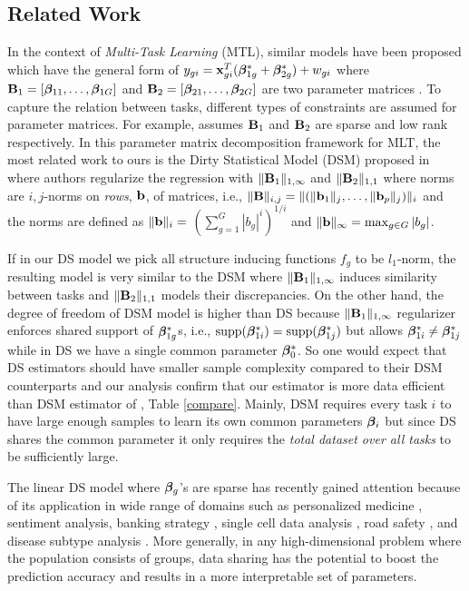 \subsection{Related Work}
In the context of \emph{Multi-Task Learning} (MTL), similar models have been proposed which have the general form of $y_{gi} = \mathbf{x}_{gi}^T (\boldsymbol{\beta}_{1g}^* + \boldsymbol{\beta}^*_{2g}) + w_{gi}$ where $\mathbf{B}_1 = [\boldsymbol{\beta}_{11}, \dots, \boldsymbol{\beta}_{1G}]$ and $\mathbf{B}_2 = [\boldsymbol{\beta}_{21}, \dots, \boldsymbol{\beta}_{2G}]$ are two parameter matrices \cite{Zhang2017-rm}. To capture the relation between tasks, different types of constraints are assumed for parameter matrices. For example, \cite{Chen2012-fb} assumes $\mathbf{B}_1$ and $\mathbf{B}_2$ are sparse and low rank respectively. In this parameter matrix decomposition framework for MLT, the most related work to ours is the Dirty Statistical Model (DSM) proposed in \cite{jrsr10} where authors regularize the regression with $\|\mathbf{B}_1\|_{1, \infty}$ and $\|\mathbf{B}_2\|_{1,1}$ where norms are $i, j$-norms on \emph{rows}, $\mathbf{b}$, of matrices, i.e., $\|\mathbf{B}\|_{i,j} = \|(\|\mathbf{b}_1\|_{j}, \dots, \|\mathbf{b}_p\|_{j})\|_{i}$ and the norms are defined as $\|\mathbf{b}\|_{i} =$ {\small$\left(\sum_{g=1}^{G}|b_g|^i\right)^{1/i}$} and $\|\mathbf{b}\|_{\infty} = \max_{g\in G} |b_g|$. 

If in our DS model we pick all structure inducing functions $f_g$ to be $l_1$-norm, the resulting model is very similar to the DSM where $\|\mathbf{B}_1\|_{1, \infty}$ induces similarity between tasks and $\|\mathbf{B}_2\|_{1,1}$ models their discrepancies. On the other hand, the degree of freedom of DSM model is higher than DS because $\|\mathbf{B}_1\|_{1, \infty}$ regularizer enforces shared support of $\boldsymbol{\beta}^*_{1g}$s, i.e., $\text{supp}(\boldsymbol{\beta}_{1i}^*) = \text{supp}(\boldsymbol{\beta}_{1j}^*)$ but allows $\boldsymbol{\beta}_{1i}^* \neq \boldsymbol{\beta}_{1j}^*$ while in DS we have a single common parameter $\boldsymbol{\beta}_0^*$. So one would expect that DS estimators should have smaller sample complexity compared to their DSM counterparts and our analysis confirm that our estimator is more data efficient than DSM estimator of \cite{jrsr10}, Table \ref{compare}. Mainly, DSM requires every task $i$ to have large enough samples to learn its own common parameters $\boldsymbol{\beta}_i$ but since DS shares the common parameter it only requires the {\em{total dataset over all tasks}} to be sufficiently large.

The linear DS model where $\boldsymbol{\beta}_g$'s are sparse has recently gained attention because of its application in wide range of domains such as personalized medicine \cite{domu16}, sentiment analysis, banking strategy \cite{grti16}, single cell data analysis \cite{olvi15}, road safety \cite{olvi14}, and disease subtype analysis \cite{domu16}.
More generally, in any high-dimensional problem where the population consists of groups, data sharing has the potential to boost the prediction accuracy and results in a more interpretable set of parameters.

